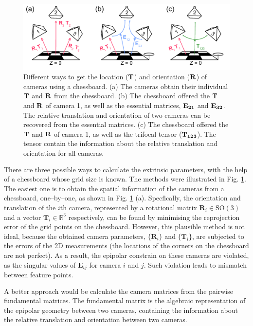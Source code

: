 \documentclass[11pt,twoside]{report}
\begin{document}
\begin{figure}
  \includegraphics[width=1\linewidth,outer]{camera-calib-ext}
  \caption[Determining the extrinsic parameters of a camera]{Different ways to get the location ($\bf{T}$) and orientation ($\bf{R}$) of cameras using a chessboard. (a) The cameras obtain their individual $\bf{T}$ and $\bf{R}$ from the chessboard. (b) The chessboard offered the $\bf{T}$ and $\bf{R}$ of camera 1, as well as the essential matrices, $\bf{E}_{21}$ and $\bf{E}_{32}$. The relative translation and orientation of two cameras can be recovered from the essential matrices. (c) The chessboard offered the $\bf{T}$ and $\bf{R}$ of camera 1, as well as the trifocal tensor ($\bf{T}_{123}$). The tensor contain the information about the relative translation and orientation for all cameras.}
  \label{fig:calib-ext}
\end{figure}

There are three possible ways to calculate the extrinsic parameters, with the help of a chessboard whose grid size is known. The methods were illustrated in Fig. \ref{fig:calib-ext}. The easiest one is to obtain the spatial information of the cameras from a chessboard, one--by--one, as shown in Fig. \ref{fig:calib-ext} (a). Specfically, the orientation and translation of the $i$th camera, represented by a rotational matrix $\mathbf{R}_i \in \mathrm{SO}(3)$ and a vector $\mathbf{T}_i \in \mathbb{R}^3$ respectively, can be found by minimising the reprojection error of the grid points on the chessboard. However, this plausible method is not ideal, because the obtained camera parameters, $\{\mathbf{R}_i\}$ and $\{\mathbf{T}_i\}$, are subjected to the errors of the 2D measurements (the locations of the corners on the chessboard are not perfect). As a result, the epipolar constrain on these cameras are violated, as the singular values of $\mathbf{E}_{ij}$ for camera $i$ and $j$. Such violation leads to mismatch between feature points.

A better approach would be calculate the camera matrices from the pairwise fundamental matrices. The fundamental matrix is the algebraic representation of the epipolar geometry between two cameras, containing the information about the relative translation and orientation between two cameras. 
\end{document}

